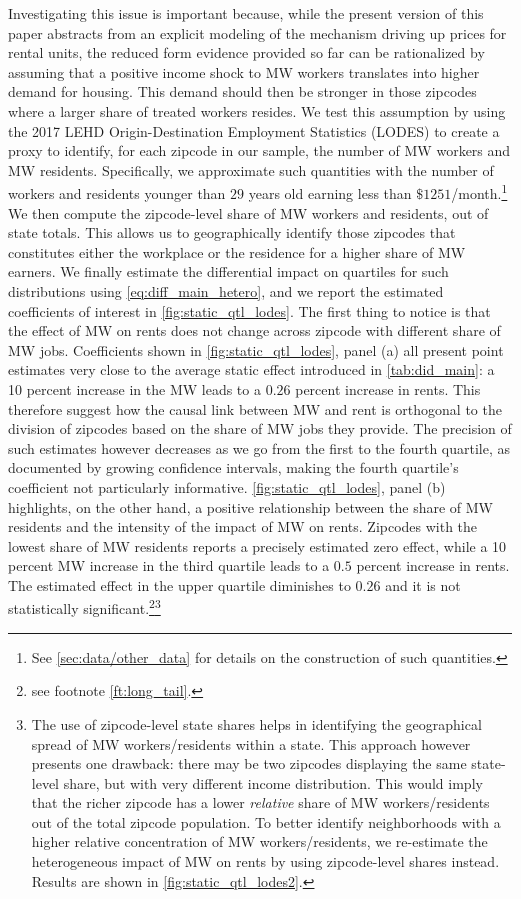 Investigating this issue is important because, while the present version of this paper abstracts from an explicit modeling 
of the mechanism driving up prices for rental units, the reduced form evidence provided so far can be rationalized by 
assuming that a positive income shock to MW workers translates into higher demand for housing. This demand 
should then be stronger in those zipcodes where a larger share of treated workers resides. We test this assumption by 
using the 2017 LEHD Origin-Destination Employment Statistics (LODES) to create a proxy to identify, for each 
zipcode in our sample, the number of MW workers and MW residents. Specifically, we approximate such quantities
with the number of workers and residents younger than $29$ years old earning less than $\$1251$/month.\footnote{See
\autoref{sec:data/other_data} for details on the construction of such quantities.}
We then compute the zipcode-level share of MW workers and residents, out of state totals. This allows us to 
geographically identify those zipcodes that constitutes either the workplace or the residence for a higher share
of MW earners. We finally estimate the differential impact on quartiles for such distributions 
using \autoref{eq:diff_main_hetero}, and we report the estimated coefficients of interest in \autoref{fig:static_qtl_lodes}.
The first thing to notice is that the effect of MW on rents does not change across zipcode with different
share of MW jobs. Coefficients shown in  \autoref{fig:static_qtl_lodes}, panel (a) all present point estimates
very close to the average static effect introduced in \autoref{tab:did_main}: a 10 percent increase in the MW leads
to a $0.26$ percent increase in rents. This therefore suggest how the causal link between MW and rent is orthogonal 
to the division of zipcodes based on the share of MW jobs they provide. The precision of such estimates however 
decreases as we go from the first to the fourth quartile, as documented by growing confidence intervals, making the 
fourth quartile's coefficient not particularly informative.
\autoref{fig:static_qtl_lodes}, panel (b) highlights, on the other hand, a positive relationship between the share of 
MW residents and the intensity of the impact of MW on rents.  Zipcodes with the lowest share of MW residents
reports a precisely estimated zero effect, while a 10 percent MW increase in the 
third quartile leads to a $0.5$ percent increase in rents. The estimated effect in the upper quartile 
diminishes to  $0.26$  and it is not statistically significant.\footnote{see footnote \ref{ft:long_tail}.}\footnote{The
use of zipcode-level state shares helps in identifying the geographical spread of MW workers/residents within 
a state. This approach however presents one drawback: there may be two zipcodes displaying the same state-level share, 
but with very different income distribution. This would imply that the richer zipcode has a lower 
\textit{relative} share of MW workers/residents out of the total zipcode population. To better identify neighborhoods with 
a higher relative concentration of MW workers/residents, we re-estimate the heterogeneous impact of MW on rents 
by using zipcode-level shares instead. Results are shown in  \autoref{fig:static_qtl_lodes2}.} 




